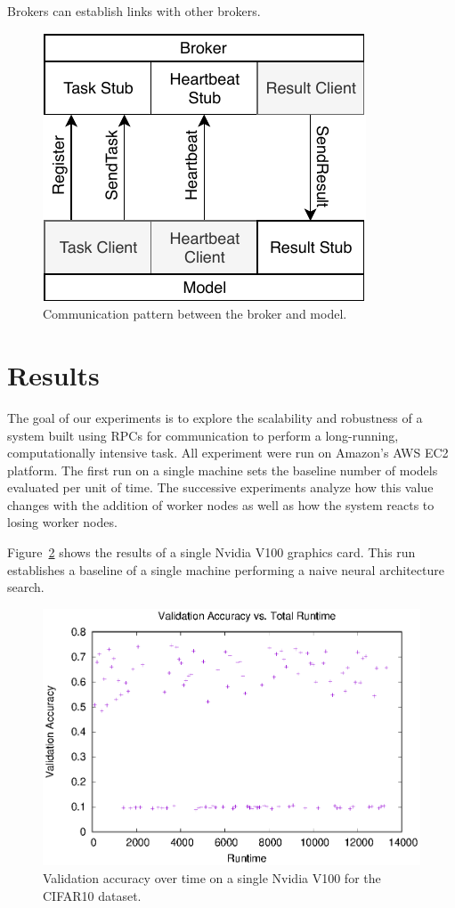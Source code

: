 \documentclass[conference]{IEEEtran}
\begin{document}
Brokers can establish links with other brokers.

\begin{figure}
  \centering
  \includegraphics{img/model_broker}
  \caption{Communication pattern between the broker and
    model.}\label{fig:broker-model}
\end{figure}

\section{Results}
The goal of our experiments is to explore the scalability and robustness
of a system built using RPCs for communication to perform a long-running,
computationally intensive task. All experiment were run on Amazon's
AWS EC2 platform. The first run on a single machine sets the baseline
number of models evaluated per unit of time. The successive experiments
analyze how this value changes with the addition of worker nodes as well
as how the system reacts to losing worker nodes.

Figure~\ref{fig:single-val} shows the results of a single Nvidia V100
graphics card. This run establishes a baseline of a single machine
performing a naive neural architecture search.

\begin{figure}
  \centering
  \includegraphics[width=\columnwidth]{result/output/single_worker}
  \caption{Validation accuracy over time on a single Nvidia V100 for
    the CIFAR10 dataset.}
  \label{fig:single-val}
\end{figure}
\end{document}
